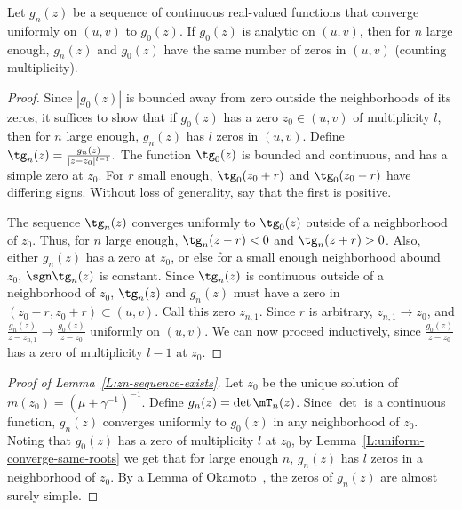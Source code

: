 \begin{lemma}\label{L:uniform-converge-same-roots}
    Let $g_n(z)$ be a sequence of continuous real-valued functions that 
    converge uniformly on $(u,v)$ to $g_0(z)$.  If $g_0(z)$ is analytic
    on $(u,v)$, then for $n$ large enough, $g_n(z)$ and $g_0(z)$ have the
    same number of zeros in $(u,v)$ (counting multiplicity).
\end{lemma}
\begin{proof}
    Since $|g_0(z)|$ is bounded away from zero outside the neighborhoods
    of its zeros, it suffices to show that if $g_0(z)$ has a zero 
    $z_0 \in (u,v)$ of multiplicity $l$, then for $n$ large enough, 
    $g_n(z)$ has $l$ zeros in $(u,v)$.  Define
    \(
        \tg_n(z) = \frac{g_n(z)}{|z - z_0|^{l-1}}.
    \)
    The function $\tg_0(z)$ is bounded and continuous, and has a 
    simple zero at $z_0$.  For $r$ small enough, $\tg_0(z_0 + r)$ and
    $\tg_0(z_0 - r)$ have differing signs.  Without loss of generality,
    say that the first is positive.  
    
    The sequence $\tg_n(z)$ converges uniformly to $\tg_0(z)$ outside of
    a neighborhood of $z_0$.  Thus, for $n$ large enough, $\tg_n(z-r) < 0$
    and $\tg_n(z+r) > 0$.  Also, either $g_n(z)$ has a zero at $z_0$, or else 
    for a small enough neighborhood abound $z_0$, $\sgn \tg_n(z)$ is constant.
    Since $\tg_n(z)$ is continuous outside of a neighborhood of $z_0$, 
    $\tg_n(z)$ and $g_n(z)$ must have a zero
    in $(z_0-r,z_0+r) \subset (u,v)$.  Call this zero $z_{n,1}$.  Since
    $r$ is arbitrary, $z_{n,1} \to z_0$, and
    $\frac{g_n(z)}{z - z_{n,1}} \to \frac{g_0(z)}{z - z_0}$ uniformly on
    $(u,v)$.  We can now proceed inductively, since $\frac{g_0(z)}{z - z_0}$
    has a zero of multiplicity $l-1$ at $z_0$.
\end{proof}

\begin{proof}[Proof of Lemma~\ref{L:zn-sequence-exists}]
    Let $z_0$ be the unique solution of $m(z_0) = (\mu + \gamma^{-1})^{-1}$.
    Define $g_n(z) = \det \mT_n(z)$.  Since $\det$ is a continuous function, 
    $g_n(z)$ converges uniformly to $g_0(z)$ in 
    any neighborhood of $z_0$.  Noting that $g_0(z)$ has a zero of 
    multiplicity 
    $l$ at $z_0$, by Lemma~\ref{L:uniform-converge-same-roots} we get that for large enough $n$, $g_n(z)$ has $l$ zeros
    in a neighborhood of $z_0$.  By a Lemma of Okamoto~\cite{okamoto1973deq}, 
    the zeros of $g_n(z)$ are almost surely simple.
\end{proof}

